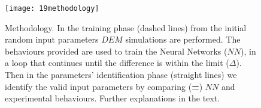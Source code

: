 \begin{figure}[!htb] 
\centering 
\texttt{[image: 19methodology]} 
\caption[Methodology]{Methodology. 
In the training phase (dashed lines) from the initial random input parameters
$DEM$ simulations are performed. The behaviours provided are used to train the
Neural Networks ($NN$), in a loop that continues until the difference is within
the limit ($\Delta$).
Then in the parameters' identification phase (straight
lines) we identify the valid input parameters by comparing (\textbf{=}) $NN$ and
experimental behaviours.
Further explanations in the text.
}
\label{fig:19methodology} 
\end{figure}





